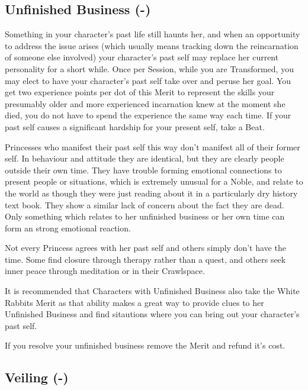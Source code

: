 \subsection*{Unfinished Business (\textbullet\nobreak\hspace{.16667em}-\nobreak\hspace{.16667em}\textbullet\textbullet\textbullet)}

Something in your character's past life still haunts her, and when an opportunity to address the issue arises (which usually means tracking down the reincarnation of someone else involved) your character's past self may replace her current personality for a short while. Once per Session, while you are Transformed, you may elect to have your character's past self take over and peruse her goal. You get two experience points per dot of this Merit to represent the skills your presumably older and more experienced incarnation knew at the moment she died, you do not have to spend the experience the same way each time. If your past self causes a significant hardship for your present self, take a Beat.

Princesses who manifest their past self this way don't manifest all of their former self. In behaviour and attitude they are identical, but they are clearly people outside their own time. They have trouble forming emotional connections to present people or situations, which is extremely unusual for a Noble, and relate to the world as though they were just reading about it in a particularly dry history text book. They show a similar lack of concern about the fact they are dead. Only something which relates to her unfinished business or her own time can form an strong emotional reaction.

Not every Princess agrees with her past self and others simply don't have the time. Some find closure through therapy rather than a quest, and others seek inner peace through meditation or in their Crawlspace.

It is recommended that Characters with Unfinished Business also take the White Rabbits Merit as that ability makes a great way to provide clues to her Unfinished Business and find sitautions where you can bring out your character's past self.

If you resolve your unfinished business remove the Merit and refund it's cost. 

\subsection*{Veiling (\textbullet\nobreak\hspace{.16667em}-\nobreak\hspace{.16667em}\textbullet\textbullet\textbullet)}

